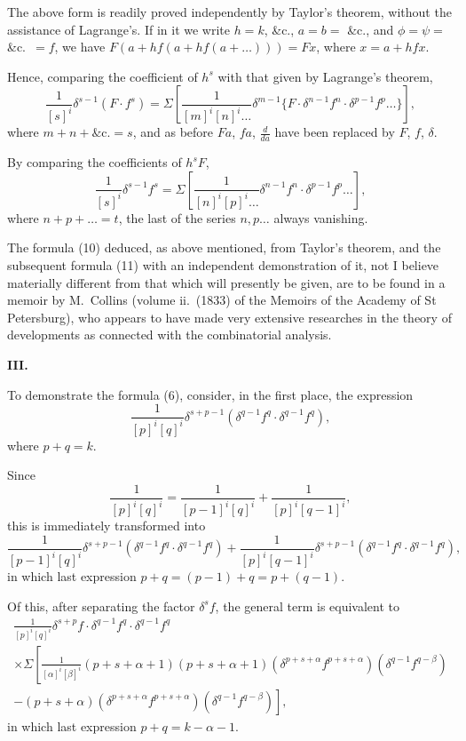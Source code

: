 \documentclass[11pt,a4paper]{article}
\theoremstyle{plain}
\begin{document}
The above form is readily proved independently by Taylor's theorem, without the assistance of Lagrange's. If in it we write $h=k$, \&c., $a=b=$ \&c., and $\phi = \psi =$ \&c.\ $=f$, we have $F(a + hf(a + hf(a + \ldots))) = Fx$, where $x = a + hfx$.

Hence, comparing the coefficient of $h^s$ with that given by Lagrange's theorem,
\begin{equation}
\frac{1}{[s]^i} \delta^{s-1}(F \cdot f^s) = \Sigma \left[ \frac{1}{[m]^i [n]^i \ldots} \delta^{m-1} \{ F \cdot \delta^{n-1} f^n \cdot \delta^{p-1} f^p \ldots \} \right],
\tag{10}
\end{equation}
where $m + n + \&\text{c.} = s$, and as before $Fa$, $fa$, $\frac{d}{da}$ have been replaced by $F$, $f$, $\delta$.

By comparing the coefficients of $h^s F$,
\begin{equation}
\frac{1}{[s]^i} \delta^{s-1} f^s = \Sigma \left[ \frac{1}{[n]^i [p]^i \ldots} \delta^{n-1} f^n \cdot \delta^{p-1} f^p \ldots \right],
\tag{11}
\end{equation}
where $n + p + \ldots = t$, the last of the series $n, p \ldots$ always vanishing.

The formula (10) deduced, as above mentioned, from Taylor's theorem, and the subsequent formula (11) with an independent demonstration of it, not I believe materially different from that which will presently be given, are to be found in a memoir by M.\ Collins (volume ii.\ (1833) of the Memoirs of the Academy of St Petersburg), who appears to have made very extensive researches in the theory of developments as connected with the combinatorial analysis.

\bigskip
\noindent\textbf{III.}

To demonstrate the formula (6), consider, in the first place, the expression
\[ \frac{1}{[p]^i [q]^i} \delta^{s+p-1} (\delta^{q-1} f^q \cdot \delta^{q-1} f^q), \]
where $p + q = k$.

Since
\[ \frac{1}{[p]^i [q]^i} = \frac{1}{[p-1]^i [q]^i} + \frac{1}{[p]^i [q-1]^i}, \]
this is immediately transformed into
\[ \frac{1}{[p-1]^i [q]^i} \delta^{s+p-1} (\delta^{q-1} f^q \cdot \delta^{q-1} f^q) + \frac{1}{[p]^i [q-1]^i} \delta^{s+p-1} (\delta^{q-1} f^q \cdot \delta^{q-1} f^q), \]
in which last expression $p + q = (p-1) + q = p + (q-1)$.

Of this, after separating the factor $\delta^s f$, the general term is equivalent to
\begin{multline*}
\frac{1}{[p]^i [q]^i} \delta^{s+p} f \cdot \delta^{q-1} f^q \cdot \delta^{q-1} f^q \\
\times \Sigma \left[ \frac{1}{[\alpha]^i [\beta]^i} (p+s+\alpha+1)(p+s+\alpha+1)(\delta^{p+s+\alpha} f^{p+s+\alpha})(\delta^{q-1} f^{q-\beta}) \right. \\
\left. - (p+s+\alpha)(\delta^{p+s+\alpha} f^{p+s+\alpha})(\delta^{q-1} f^{q-\beta}) \right],
\end{multline*}
in which last expression $p + q = k - \alpha - 1$.
\end{document}
